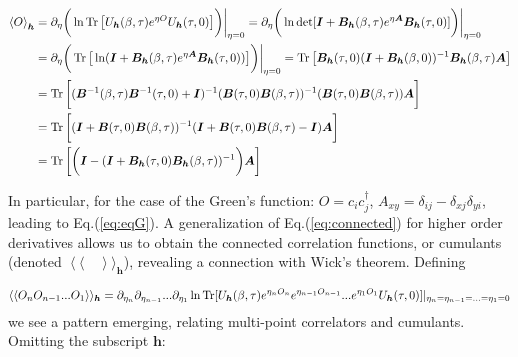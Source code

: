 \begin{equation}\label{eq:connected}
\begin{split}
\left\langle O \right\rangle_{\bm h} &= \partial_\eta \bigg( \ln \operatorname{Tr} \big[ U_{\bm h} (\beta, \tau ) e^{\eta O} U_{\bm h} (\tau, 0) \big] \bigg) \bigg|_{\eta = 0} = \partial_\eta \bigg( \ln \det [ \bm I + \bm B_{\bm h} ( \beta, \tau ) e^{\eta \bm A} \bm B_{\bm h} (\tau, 0)  ] \bigg) \bigg|_{\eta = 0} \\
&=  \partial_\eta \bigg( \operatorname{Tr} \big[  \ln  ( \bm I + \bm B_{\bm h} ( \beta, \tau ) e^{\eta \bm A} \bm B_{\bm h} (\tau, 0)  ) \big] \bigg) \bigg|_{\eta = 0} = \operatorname{Tr} \big[ \bm B_{\bm h} (\tau, 0) ( \bm I + \bm B_{\bm h} ( \beta, 0 ) )^{-1} \bm B_{\bm h} ( \beta, \tau ) \bm A \big] \\
&= \operatorname{Tr} \bigg[ ( \bm B^{-1} (\beta, \tau) \bm B^{-1} (\tau, 0) + \bm I )^{-1} ( \bm B (\tau, 0) \bm B (\beta, \tau) )^{-1} ( \bm B (\tau, 0) \bm B (\beta, \tau) ) \bm A \bigg]  \\
&= \operatorname{Tr} \bigg[ ( \bm I + \bm B ( \tau, 0 ) \bm B ( \beta, \tau ) )^{-1} ( \bm I +  \bm B ( \tau, 0 ) \bm B ( \beta, \tau ) - \bm I ) \bm A \bigg] \\
&= \operatorname{Tr} \bigg[  \bigg( \bm I - ( \bm I + \bm B_{\bm h} ( \tau, 0 ) \bm B_{\bm h} (\beta, \tau) )^{-1} \bigg) \bm A \bigg]
\end{split}
\end{equation}

In particular, for the case of the Green's function: $O = c_i c_j^\dagger$, $A_{xy} = \delta_{i j} - \delta_{xj} \delta_{yi}$, leading to Eq.(\ref{eq:eqG}).
A generalization of Eq.(\ref{eq:connected}) for higher order derivatives allows us to obtain the connected correlation functions, or cumulants (denoted $\left\langle\langle \quad \right\rangle\rangle_{\bm h}$), revealing a connection with Wick's theorem.
Defining

\begin{equation}
\left\langle\langle O_n O_{n-1}... O_1  \right\rangle\rangle_{\bm h} = \partial_{\eta_n} \partial_{\eta_{n-1}} ... \partial_{\eta_1} \ln \operatorname{Tr} [ U_{\bm h} (\beta, \tau ) e^{\eta_n O_n} e^{\eta_{n-1} O_{n-1}} ... e^{\eta_1 O_1} U_{\bm h} (\tau, 0) ] |_{\eta_n = \eta_{n-1} =...= \eta_1 = 0}
\end{equation}
we see a pattern emerging, relating multi-point correlators and cumulants.
Omitting the subscript $\bm h$:

